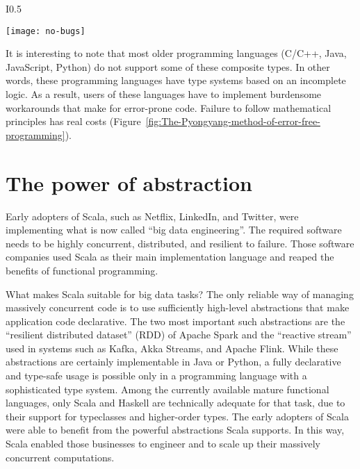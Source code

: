 \begin{wrapfigure}{I}{0.5\columnwidth}%
\begin{centering}
\vspace{-0.5\baselineskip}
\texttt{[image: no-bugs]}\vspace{-0.5\baselineskip}
\par\end{centering}
\caption{The Pyongyang method of error-free software engineering.\label{fig:The-Pyongyang-method-of-error-free-programming}}
\vspace{-3\baselineskip}
\end{wrapfigure}%

It is interesting to note that most older programming languages (C/C++,
Java, JavaScript, Python) do not support some of these composite types.
In other words, these programming languages have type systems based
on an incomplete logic. As a result, users of these languages have
to implement burdensome workarounds that make for error-prone code.
Failure to follow mathematical principles has real costs (Figure~\ref{fig:The-Pyongyang-method-of-error-free-programming}).

\section{The power of abstraction}

Early adopters of Scala, such as Netflix, LinkedIn, and Twitter, were
implementing what is now called \textsf{``}big data engineering\textsf{''}. The required
software needs to be highly concurrent, distributed, and resilient
to failure. Those software companies used Scala as their main implementation
language and reaped the benefits of functional programming.

What makes Scala suitable for big data tasks? The only reliable way
of managing massively concurrent code is to use sufficiently high-level
abstractions that make application code declarative. The two most
important such abstractions are the \textsf{``}resilient distributed dataset\textsf{''}
(RDD) of Apache Spark and the \textsf{``}reactive stream\textsf{''} used in systems
such as Kafka, Akka Streams, and Apache Flink. While these abstractions
are certainly implementable in Java or Python, a fully declarative
and type-safe usage is possible only in a programming language with
a sophisticated type system. Among the currently available mature
functional languages, only Scala and Haskell are technically adequate
for that task, due to their support for typeclasses and higher-order
types. The early adopters of Scala were able to benefit from the powerful
abstractions Scala supports. In this way, Scala enabled those businesses
to engineer and to scale up their massively concurrent computations.


